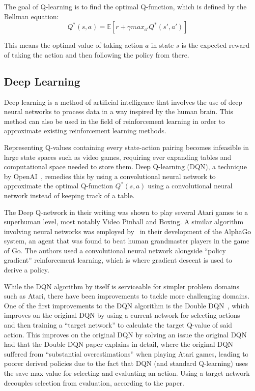 \documentclass[12pt,a4paper]{article}
\begin{document}
    The goal of Q-learning is to find the optimal Q-function, which is defined by the Bellman equation:
    \[Q^{*}(s, a) = \mathbb{E} [r + \gamma max_{a'} Q^{*}(s', a')]\]

    This means the optimal value of taking action \(a\) in state \(s\) is the expected reward of taking the action and then following the policy from there.

    \subsection{Deep Learning}\label{subsec:deep-learning}
    Deep learning is a method of artificial intelligence that involves the use of deep neural networks to process data in a way inspired by the human brain.
    This method can also be used in the field of reinforcement learning in order to approximate existing reinforcement learning methods.

    Representing Q-values containing every state-action pairing becomes infeasible in large state spaces such as video
    games, requiring ever expanding tables and computational space needed to store them.
    Deep Q-learning (DQN), a technique by OpenAI~\citep{mnih15}, remedies this by using a convolutional neural network to
    approximate the optimal Q-function \(Q^*(s, a)\) using a convolutional neural network instead of keeping track of
    a table.

    The Deep Q-network in their writing was shown to play several Atari games to a superhuman level, most notably Video Pinball and Boxing.
    A similar algorithm involving neural networks was employed by~\citet{silver16} in their development of the AlphaGo system, an agent that was found to beat human grandmaster players in the game of Go.
    The authors used a convolutional neural network alongside ``policy gradient'' reinforcement learning, which is where gradient descent is used to derive a policy.

    While the DQN algorithm by itself is serviceable for simpler problem domains such as Atari, there have been improvements to tackle more challenging domains.
    One of the first improvements to the DQN algorithm is the Double DQN~\citep{hasselt15}, which improves on the original DQN by using a current network for selecting actions
    and then training a ``target network'' to calculate the target Q-value of said action.
    This improves on the original DQN by solving an issue the original DQN had that the Double DQN paper explains in detail,
    where the original DQN suffered from ``substantial overestimations'' when playing Atari games, leading to poorer derived policies due to the fact that
    DQN (and standard Q-learning) uses the save max value for selecting and evaluating an action.
    Using a target network decouples selection from evaluation, according to the paper.
\end{document}
